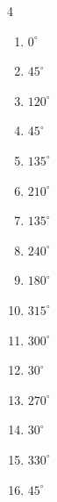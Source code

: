 \begin{multicols}{4}
\begin{enumerate}
  \item $\displaystyle 0^{\circ}$
        \phantom{$\displaystyle =0$}

  \item $\displaystyle 45^{\circ}$

  \item $\displaystyle 120^{\circ}$

  \item $\displaystyle 45^{\circ}$

  \item $\displaystyle 135^{\circ}$

  \item $\displaystyle 210^{\circ}$

  \item $\displaystyle 135^{\circ}$

  \item $\displaystyle 240^{\circ}$

  \item $\displaystyle 180^{\circ}$
        \phantom{$\displaystyle =\pi$}

  \item $\displaystyle 315^{\circ}$

  \item $\displaystyle 300^{\circ}$

\columnbreak %

\resetques

  \item $\displaystyle 30^{\circ}$

  \item $\displaystyle 270^{\circ}$

  \item $\displaystyle 30^{\circ}$

  \item $\displaystyle 330^{\circ}$

  \item $\displaystyle 45^{\circ}$


\end{enumerate}
\end{multicols}
